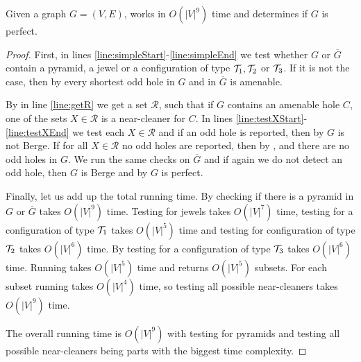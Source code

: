 \begin{theorem}
	Given a graph $G = (V, E)$,  works in $O(|V|^9)$ time and determines if $G$ is perfect.
\end{theorem}
\begin{proof}
	First, in lines \ref{line:simpleStart}-\ref{line:simpleEnd} we test whether $G$ or $\overline{G}$ contain a pyramid, a jewel or a configuration of type $\mathcal{T}_1, \mathcal{T}_2$ or $\mathcal{T}_3$. If it is not the case, then by  every shortest odd hole in $G$ and in $\overline{G}$ is amenable. 
	
	By  in line \ref{line:getR} we get a set $\mathcal{R}$, such that if $G$ contains an amenable hole $C$, one of the sets $X \in \mathcal{R}$ is a near-cleaner for $C$. In lines \ref{line:testXStart}-\ref{line:testXEnd} we test each $X \in \mathcal{R}$ and if an odd hole is reported, then by  $G$ is not Berge. If for all $X \in \mathcal{R}$ no odd holes are reported, then by ,  and  there are no odd holes in $G$. We run the same checks on $\overline{G}$ and if again we do not detect an odd hole, then $G$ is Berge and by  $G$ is perfect.

	Finally, let us add up the total running time. By  checking if there is a pyramid in $G$ or $\overline{G}$ takes $O(|V|^9)$ time. Testing for jewels takes $O(|V|^7)$ time, testing for a configuration of type $\mathcal{T}_1$ takes $O(|V|^5)$ time and testing for configuration of type $\mathcal{T}_2$ takes $O(|V|^6)$ time. By  testing for a configuration of type $\mathcal{T}_3$ takes $O(|V|^6)$ time. Running  takes $O(|V|^5)$ time and returns $O(|V|^5)$ subsets. For each subset running  takes $O(|V|^4)$ time, so testing all possible near-cleaners takes $O(|V|^9)$ time.

	The overall running time is $O(|V|^9)$ with testing for pyramids and testing all possible near-cleaners being parts with the biggest time complexity.
\end{proof}